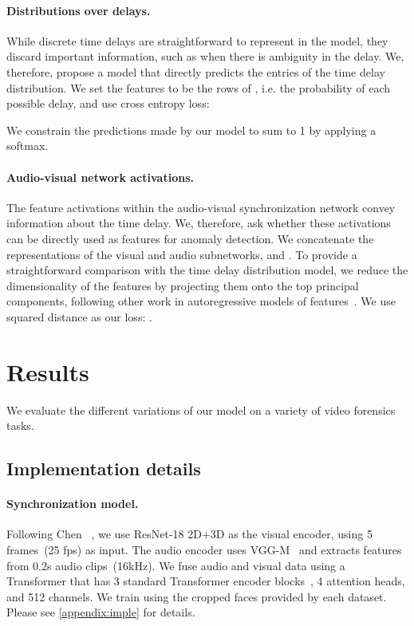 \documentclass[10pt,twocolumn,letterpaper]{article}
\newcommand{\mypar}[1]{\vspace{-3mm}\paragraph{#1}}
\newcommand{\supparxiv}[2]{#2}
\begin{document}
\mypar{Distributions over delays.}\label{kl-model} 
While discrete time delays are straightforward to represent in the model, they discard important information, such as when there is ambiguity in the delay.
We, therefore, propose a model that directly predicts the entries of the time delay distribution. 
We set the features  to be the rows of , i.e. the probability of each possible delay, and use cross entropy loss:


We constrain the predictions made by our model  to sum to 1 by applying a softmax.






\mypar{Audio-visual network activations.}
The feature activations within the audio-visual synchronization network convey information about the time delay. We, therefore, ask whether these activations can be directly used as features for anomaly detection. We concatenate the representations of the visual and audio subnetworks,  and . To provide a straightforward comparison with the time delay distribution model, we reduce the dimensionality of the features by projecting them onto the top  principal components, following other work in autoregressive models of features~\cite{ramesh2022hierarchical}. We use squared distance as our loss: .










 
\section{Results}
We evaluate the different variations of our model on a variety of video forensics tasks. 

\subsection{Implementation details}
\label{implementation}
\paragraph{Synchronization model.} 

Following Chen \etal~\cite{chen2021audio}, we use ResNet-18 2D+3D\cite{he2016deep, hara2018can} as the visual encoder, using 5 frames~(25 fps) as input. The audio encoder uses VGG-M~\cite{chatfield2014return} and extracts features from 0.2s audio clips~(16kHz).
We fuse audio and visual data using a Transformer that has 3 standard Transformer encoder blocks~\cite{vaswani2017attention}, 4 attention heads, and 512 channels. We train using the cropped faces provided by each dataset. Please see \supparxiv{the supplement}{\cref{appendix:imple}} for details.
\end{document}
